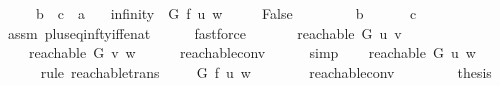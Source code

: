 \begin{isabellebody}
\ \ \ \ {\isacharparenleft}{\kern0pt}\ {\isachardoublequoteopen}{\isacharquery}{\kern0pt}b\ {\isacharplus}{\kern0pt}\ {\isacharquery}{\kern0pt}c\ {\isacharless}{\kern0pt}\ {\isacharquery}{\kern0pt}a{\isachardoublequoteclose}{\isacharparenright}{\kern0pt}\isanewline
\ \ \ infinity{\isacharcolon}{\kern0pt}\ {\isachardoublequoteopen}{\isasymdelta}\ G\ f\ u\ w\ {\isacharequal}{\kern0pt}\ {\isasyminfinity}{\isachardoublequoteclose}\isanewline
\ \ \ {\isachardoublequoteopen}False{\isachardoublequoteclose}%
\endisataginvisible
{\isafoldinvisible}%
%
\isadeliminvisible
\isanewline
%
\endisadeliminvisible
%
\isadelimproof
%
\endisadelimproof
%
\isatagproof
{}\isamarkupfalse%
\ {\isacharminus}{\kern0pt}\isanewline
\ \ \isamarkupfalse%
\isanewline
\ \ \ \ {\isachardoublequoteopen}{\isacharquery}{\kern0pt}b\ {\isasymnoteq}\ {\isasyminfinity}{\isachardoublequoteclose}\isanewline
\ \ \ \ {\isachardoublequoteopen}{\isacharquery}{\kern0pt}c\ {\isasymnoteq}\ {\isasyminfinity}{\isachardoublequoteclose}\isanewline
\ \ \ \ \isamarkupfalse%
\ assm\ plus{\isacharunderscore}{\kern0pt}eq{\isacharunderscore}{\kern0pt}infty{\isacharunderscore}{\kern0pt}iff{\isacharunderscore}{\kern0pt}enat\isanewline
\ \ \ \ \isamarkupfalse%
\ fastforce{\isacharplus}{\kern0pt}\isanewline
\ \ \isamarkupfalse%
\isanewline
\ \ \ \ {\isachardoublequoteopen}reachable\ G\ u\ v{\isachardoublequoteclose}\isanewline
\ \ \ \ {\isachardoublequoteopen}reachable\ G\ v\ w{\isachardoublequoteclose}\isanewline
\ \ \ \ \isamarkupfalse%
\ {\isasymdelta}{\isacharunderscore}{\kern0pt}reachable{\isacharunderscore}{\kern0pt}conv\isanewline
\ \ \ \ \isamarkupfalse%
\ simp{\isacharplus}{\kern0pt}\isanewline
\ \ \isamarkupfalse%
\ {\isachardoublequoteopen}reachable\ G\ u\ w{\isachardoublequoteclose}\isanewline
\ \ \ \ \isamarkupfalse%
\ {\isacharparenleft}{\kern0pt}rule\ reachable{\isacharunderscore}{\kern0pt}trans{\isacharparenright}{\kern0pt}\isanewline
\ \ \isamarkupfalse%
\ {\isachardoublequoteopen}{\isasymdelta}\ G\ f\ u\ w\ {\isasymnoteq}\ {\isasyminfinity}{\isachardoublequoteclose}\isanewline
\ \ \ \ \isamarkupfalse%
\ {\isasymdelta}{\isacharunderscore}{\kern0pt}reachable{\isacharunderscore}{\kern0pt}conv\isanewline
\ \ \ \ \isacommand{{\isachardot}{\kern0pt}}\isamarkupfalse%
\isanewline
\ \ \isamarkupfalse%
\ {\isacharquery}{\kern0pt}thesis\isanewline
\ \ \ \ \isamarkupfalse%

\end{isabellebody}
